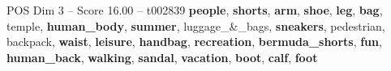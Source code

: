 \begin{textsample}{POS Dim 3 – Score 16.00 – t002839}  \label{ex:f3_pos_021}
\textbf{people}, \textbf{shorts}, \textbf{arm}, \textbf{shoe}, \textbf{leg}, \textbf{bag}, temple, \textbf{human\_body}, \textbf{summer}, luggage\_\&\_bags, \textbf{sneakers}, pedestrian, backpack, \textbf{waist}, \textbf{leisure}, \textbf{handbag}, \textbf{recreation}, \textbf{bermuda\_shorts}, \textbf{fun}, \textbf{human\_back}, \textbf{walking}, \textbf{sandal}, \textbf{vacation}, \textbf{boot}, \textbf{calf}, \textbf{foot}

\end{textsample}
